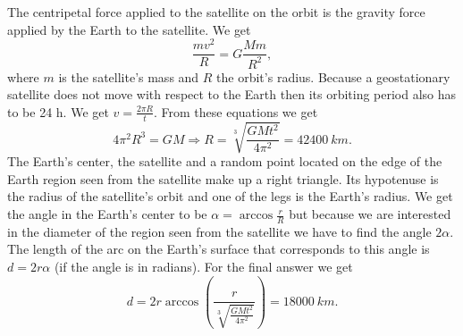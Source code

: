 {\ifEngSolution
The centripetal force applied to the satellite on the orbit is the gravity force applied by the Earth to the satellite. We get 
$$\frac{mv^2}{R}=G\frac{Mm}{R^2},$$
where $m$ is the satellite’s mass and $R$ the orbit’s radius. Because a geostationary satellite does not move with respect to the Earth then its orbiting period also has to be 24 h. We get $v=\frac{2\pi R}{t}$. From these equations we get
$$4\pi^2 R^3=GM \Rightarrow R=\sqrt[3]{\frac{GMt^2}{4\pi^2}}=\SI{42400}{km}.$$
The Earth’s center, the satellite and a random point located on the edge of the Earth region seen from the satellite make up a right triangle. Its hypotenuse is the radius of the satellite’s orbit and one of the legs is the Earth’s radius. We get the angle in the Earth’s center to be $\alpha=\arccos{\frac{r}{R}}$ but because we are interested in the diameter of the region seen from the satellite we have to find the angle $2\alpha$. The length of the arc on the Earth’s surface that corresponds to this angle is $d=2r\alpha$ (if the angle is in radians). For the final answer we get
$$d=2r\arccos \left(\frac{r}{\sqrt[3]{\frac{GMt^2}{4\pi^2}}}\right) =\SI{18000}{km}.$$
\fi
}